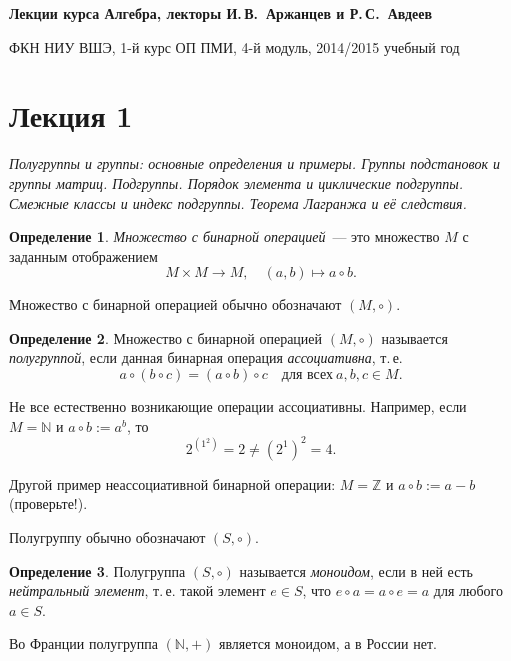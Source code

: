 \documentclass[a4paper,10pt]{amsart}
\def\ZZ{{\mathbb Z}}%
\def\NN{{\mathbb N}}%
\theoremstyle{definition}
\newtheorem{definition}{Определение}
\theoremstyle{remark}
\begin{document}
%
\sloppy
%
\centerline{\large \bf Лекции курса \guillemotleft
Алгебра\guillemotright{}, лекторы И.\,В.~Аржанцев и Р.\,С.~Авдеев}

\smallskip

\centerline{\large ФКН НИУ ВШЭ, 1-й курс ОП ПМИ, 4-й модуль,
2014/2015 учебный год}


\bigskip

\section*{Лекция 1}

\medskip

{\it Полугруппы и группы: основные определения и примеры. Группы
подстановок и группы матриц. Подгруппы. Порядок элемента и
циклические подгруппы. Смежные классы и индекс подгруппы. Теорема
Лагранжа и её следствия.}

\medskip

\begin{definition}
{\it Множество с бинарной операцией}~--- это множество $M$ с
заданным отображением
$$
M\times M \to M, \quad (a,b) \mapsto a\circ b.
$$
\end{definition}

Множество с бинарной операцией обычно обозначают $(M,\circ)$.

\begin{definition}
Множество с бинарной операцией $(M,\circ)$ называется {\it
полугруппой}, если данная бинарная операция {\it ассоциативна},
т.\,е.
$$
a\circ (b \circ c) = (a\circ b)\circ c \quad \text{для всех} \ a,b,c\in M.
$$
\end{definition}

Не все естественно возникающие операции ассоциативны. Например, если
$M=\NN$ и $a\circ b:=a^b$, то
$$
2^{\left(1^2\right)}=2\ne (2^1)^2=4.
$$

Другой пример неассоциативной бинарной операции: $M = \ZZ$ и $a
\circ b := a - b$ (проверьте!).

Полугруппу обычно обозначают $(S,\circ)$.

\begin{definition}
Полугруппа $(S,\circ)$ называется {\it моноидом}, если в ней есть
{\it нейтральный элемент}, т.\,е. такой элемент $e\in S$, что
$e\circ a=a\circ e=a$ для любого $a\in S$.
\end{definition}

Во Франции полугруппа $(\NN,+)$ является моноидом, а в России нет.
\end{document}
